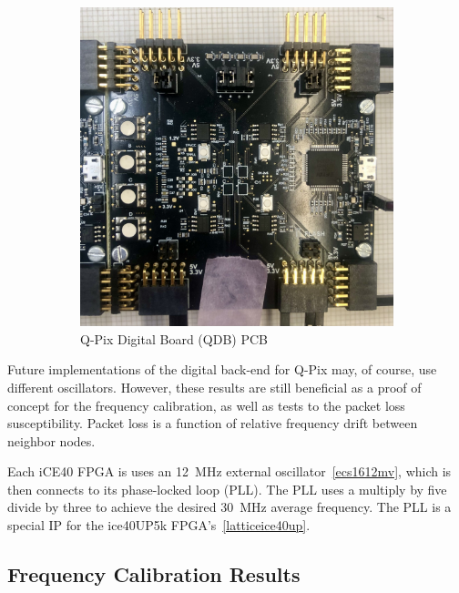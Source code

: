 \begin{figure}
\begin{subfigure}{.5\textwidth}
  \includegraphics[width=\textwidth]{images/qdb_closeup.jpg}
  \caption{Q-Pix Digital Board (QDB) PCB}
\end{subfigure}
\caption{}
\label{fig:qdb_diagram}
\end{figure}

Future implementations of the digital back-end for Q-Pix may, of course, use different oscillators.
However, these results are still beneficial as a proof of concept for the frequency calibration, as well as tests to the packet loss susceptibility.
Packet loss is a function of relative frequency drift between neighbor nodes.

Each iCE40 FPGA is uses an 12~\unit{MHz} external oscillator~\ref{ecs1612mv}, which is then connects to its phase-locked loop (PLL).
The PLL uses a multiply by five divide by three to achieve the desired 30~\unit{MHz} average frequency.
The PLL is a special IP for the ice40UP5k FPGA's~\ref{latticeice40up}.



\subsection{Frequency Calibration Results}



